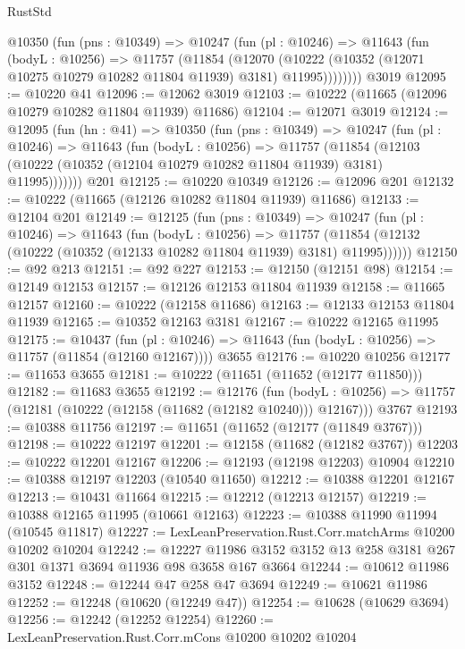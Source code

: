 \begin{lexlean}{RustStd}
\begin{coremodule}
      @10350
        (fun (pns : @10349) =>
        @10247
          (fun (pl : @10246) =>
          @11643
            (fun (bodyL : @10256) =>
            @11757
              (@11854
                (@12070
                  (@10222 (@10352 (@12071 @10275 @10279 @10282 @11804 @11939) @3181) @11995))))))))
    @3019
@12095 := @10220 @41
@12096 := @12062 @3019
@12103 := @10222 (@11665 (@12096 @10279 @10282 @11804 @11939) @11686)
@12104 := @12071 @3019
@12124 := @12095
    (fun (hn : @41) =>
    @10350
      (fun (pns : @10349) =>
      @10247
        (fun (pl : @10246) =>
        @11643
          (fun (bodyL : @10256) =>
          @11757
            (@11854
              (@12103 (@10222 (@10352 (@12104 @10279 @10282 @11804 @11939) @3181) @11995)))))))
    @201
@12125 := @10220 @10349
@12126 := @12096 @201
@12132 := @10222 (@11665 (@12126 @10282 @11804 @11939) @11686)
@12133 := @12104 @201
@12149 := @12125
    (fun (pns : @10349) =>
    @10247
      (fun (pl : @10246) =>
      @11643
        (fun (bodyL : @10256) =>
        @11757 (@11854 (@12132 (@10222 (@10352 (@12133 @10282 @11804 @11939) @3181) @11995))))))
@12150 := @92 @213
@12151 := @92 @227
@12153 := @12150 (@12151 @98)
@12154 := @12149 @12153
@12157 := @12126 @12153 @11804 @11939
@12158 := @11665 @12157
@12160 := @10222 (@12158 @11686)
@12163 := @12133 @12153 @11804 @11939
@12165 := @10352 @12163 @3181
@12167 := @10222 @12165 @11995
@12175 := @10437
    (fun (pl : @10246) => @11643 (fun (bodyL : @10256) => @11757 (@11854 (@12160 @12167))))
    @3655
@12176 := @10220 @10256
@12177 := @11653 @3655
@12181 := @10222 (@11651 (@11652 (@12177 @11850)))
@12182 := @11683 @3655
@12192 := @12176
    (fun (bodyL : @10256) => @11757 (@12181 (@10222 (@12158 (@11682 (@12182 @10240))) @12167)))
    @3767
@12193 := @10388 @11756
@12197 := @11651 (@11652 (@12177 (@11849 @3767)))
@12198 := @10222 @12197
@12201 := @12158 (@11682 (@12182 @3767))
@12203 := @10222 @12201 @12167
@12206 := @12193 (@12198 @12203) @10904
@12210 := @10388 @12197 @12203 (@10540 @11650)
@12212 := @10388 @12201 @12167
@12213 := @10431 @11664
@12215 := @12212 (@12213 @12157)
@12219 := @10388 @12165 @11995 (@10661 @12163)
@12223 := @10388 @11990 @11994 (@10545 @11817)
@12227 := LexLeanPreservation.Rust.Corr.matchArms @10200 @10202 @10204
@12242 := @12227 @11986 @3152 @3152 @13 @258 @3181 @267 @301 @1371 @3694 @11936 @98 @3658 @167 @3664
@12244 := @10612 @11986 @3152
@12248 := @12244 @47 @258 @47 @3694
@12249 := @10621 @11986
@12252 := @12248 (@10620 (@12249 @47))
@12254 := @10628 (@10629 @3694)
@12256 := @12242 (@12252 @12254)
@12260 := LexLeanPreservation.Rust.Corr.mCons @10200 @10202 @10204

\end{coremodule}
\end{lexlean}
